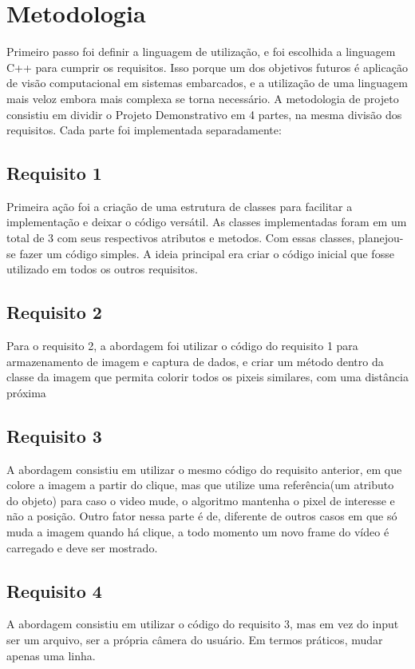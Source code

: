 \section{Metodologia}
\label{metodologia}

Primeiro passo foi definir a linguagem de utilização, e foi escolhida a linguagem C++ para cumprir os requisitos. Isso porque um dos objetivos futuros é aplicação de visão computacional em sistemas embarcados, e a utilização de uma linguagem mais veloz embora mais complexa se torna necessário. A metodologia de projeto consistiu em dividir o Projeto Demonstrativo em 4 partes, na mesma divisão dos requisitos. Cada parte foi implementada separadamente:

\subsection{Requisito 1}

Primeira ação foi a criação de uma estrutura de classes para facilitar a implementação e deixar o código versátil. As classes implementadas foram em um total de 3 com seus respectivos atributos e metodos. Com essas classes, planejou-se fazer um código simples. A ideia principal era criar o código inicial que fosse utilizado em todos os outros requisitos.

\subsection{Requisito 2}

Para o requisito 2, a abordagem foi utilizar o código do requisito 1 para armazenamento de imagem e captura de dados, e criar um método dentro da classe da imagem que permita colorir todos os pixeis similares, com uma distância próxima

\subsection{Requisito 3}

A abordagem consistiu em utilizar o mesmo código do requisito anterior, em que colore a imagem a partir do clique, mas que utilize uma referência(um atributo do objeto) para caso o video mude, o algoritmo mantenha o pixel de interesse e não a posição. Outro fator nessa parte é de, diferente de outros casos em que só muda a imagem quando há clique, a todo momento um novo frame do vídeo é carregado e deve ser mostrado.

\subsection{Requisito 4}

A abordagem consistiu em utilizar o código do requisito 3, mas em vez do input ser um arquivo, ser a própria câmera do usuário. Em termos práticos, mudar apenas uma linha. 

